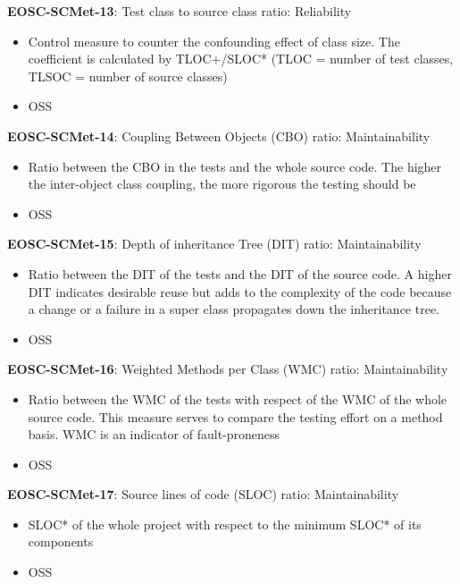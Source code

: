 \textbf{EOSC-SCMet-13}: Test class to source class ratio: Reliability

\begin{itemize}
    \item Control measure to counter the confounding effect of class size. The coefficient is calculated by TLOC+/SLOC*  (TLOC = number of test classes, TLSOC = number of source classes) \cite{nagappan_early_2005}
    \item OSS
\end{itemize}

\textbf{EOSC-SCMet-14}: Coupling Between Objects (CBO) ratio: Maintainability

\begin{itemize}
    \item Ratio between the CBO in the tests and the whole source code. The higher the inter-object class coupling, the more rigorous the testing should be \cite{nagappan_early_2005}
    \item OSS
\end{itemize}

\textbf{EOSC-SCMet-15}: Depth of inheritance Tree (DIT) ratio: Maintainability

\begin{itemize}
    \item Ratio between the DIT of the tests and the DIT of the source code. A higher DIT indicates desirable reuse but adds to the
complexity of the code because a change or a failure in a super class propagates down the inheritance tree. \cite{nagappan_early_2005}
    \item OSS
\end{itemize}

\textbf{EOSC-SCMet-16}: Weighted Methods per Class (WMC) ratio: Maintainability

\begin{itemize}
    \item Ratio between the WMC of the tests with respect of the WMC of the whole source code. This measure serves to compare the testing effort on a method basis. WMC is an indicator of fault-proneness \cite{nagappan_early_2005}
    \item OSS
\end{itemize}

\textbf{EOSC-SCMet-17}: Source lines of code (SLOC) ratio: Maintainability

\begin{itemize}
    \item SLOC* of the whole project with respect to the minimum SLOC* of its components \cite{nagappan_early_2005}
    \item OSS
\end{itemize}

